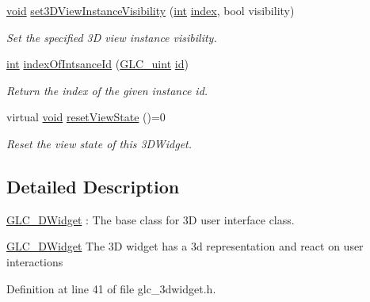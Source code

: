 \begin{DoxyCompactItemize}
\hyperlink{group___u_a_v_objects_plugin_ga444cf2ff3f0ecbe028adce838d373f5c}{void} \hyperlink{class_g_l_c__3_d_widget_af357f60fb39633aebb154b7a614fcfb8}{set3\-D\-View\-Instance\-Visibility} (\hyperlink{ioapi_8h_a787fa3cf048117ba7123753c1e74fcd6}{int} \hyperlink{glext_8h_ab47dd9958bcadea08866b42bf358e95e}{index}, bool visibility)
\begin{DoxyCompactList}\small\item\em Set the specified 3\-D view instance visibility. \end{DoxyCompactList}\item 
\hyperlink{ioapi_8h_a787fa3cf048117ba7123753c1e74fcd6}{int} \hyperlink{class_g_l_c__3_d_widget_a9703313e7f8c4084eee9df3a66b5c2c4}{index\-Of\-Intsance\-Id} (\hyperlink{glc__global_8h_abf950976fabed69026558df8e2da6c6b}{G\-L\-C\-\_\-uint} \hyperlink{glext_8h_a58c2a664503e14ffb8f21012aabff3e9}{id})
\begin{DoxyCompactList}\small\item\em Return the index of the given instance id. \end{DoxyCompactList}\item 
virtual \hyperlink{group___u_a_v_objects_plugin_ga444cf2ff3f0ecbe028adce838d373f5c}{void} \hyperlink{class_g_l_c__3_d_widget_ad7a2b4238c9838b2b2b58a6feb349b54}{reset\-View\-State} ()=0
\begin{DoxyCompactList}\small\item\em Reset the view state of this 3\-D\-Widget. \end{DoxyCompactList}\end{DoxyCompactItemize}


\subsection{Detailed Description}
\hyperlink{class_g_l_c__3_d_widget}{G\-L\-C\-\_\-D\-Widget} \-: The base class for 3\-D user interface class. 

\hyperlink{class_g_l_c__3_d_widget}{G\-L\-C\-\_\-D\-Widget} The 3\-D widget has a 3d representation and react on user interactions 

Definition at line 41 of file glc\-\_\-3dwidget.\-h.



